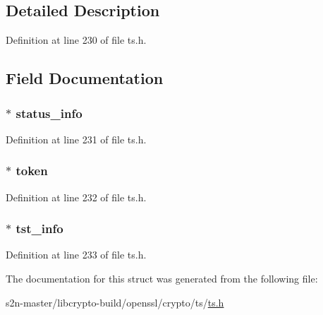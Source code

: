 \subsection{Detailed Description}


Definition at line 230 of file ts.\+h.



\subsection{Field Documentation}
\subsubsection[{\texorpdfstring{status\+\_\+info}{status_info}}]{ $\ast$ status\+\_\+info}\hypertarget{struct_t_s__resp__st_a658c4c7389e6ce0a1b7ac5c8dbc5f2c0}{}\label{struct_t_s__resp__st_a658c4c7389e6ce0a1b7ac5c8dbc5f2c0}


Definition at line 231 of file ts.\+h.

\subsubsection[{\texorpdfstring{token}{token}}]{ $\ast$ token}\hypertarget{struct_t_s__resp__st_ad39eecc4084bb685b12436d310e2b128}{}\label{struct_t_s__resp__st_ad39eecc4084bb685b12436d310e2b128}


Definition at line 232 of file ts.\+h.

\subsubsection[{\texorpdfstring{tst\+\_\+info}{tst_info}}]{ $\ast$ tst\+\_\+info}\hypertarget{struct_t_s__resp__st_aaca0fcdfa8c33f023dab39596693bef0}{}\label{struct_t_s__resp__st_aaca0fcdfa8c33f023dab39596693bef0}


Definition at line 233 of file ts.\+h.



The documentation for this struct was generated from the following file\+:\begin{DoxyCompactItemize}
\item 
s2n-\/master/libcrypto-\/build/openssl/crypto/ts/\hyperlink{crypto_2ts_2ts_8h}{ts.\+h}\end{DoxyCompactItemize}
